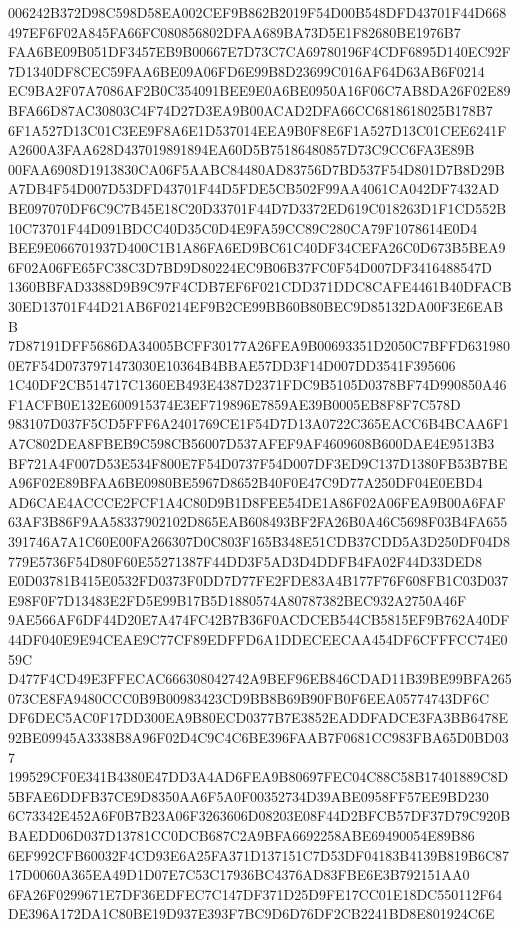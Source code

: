 \documentclass[UTF8,fontset=fandol,zihao=-4,a4paper]{ctexart}
\begin{document}
{{006242B372D98C598D58EA002CEF9B862B2019F54D00B548DFD43701F44D668497EF6F02A845FA66FC080856802DFAA689BA73D5E1F82680BE1976B7
FAA6BE09B051DF3457EB9B00667E7D73C7CA69780196F4CDF6895D140EC92F7D1340DF8CEC59FAA6BE09A06FD6E99B8D23699C016AF64D63AB6F0214
EC9BA2F07A7086AF2B0C354091BEE9E0A6BE0950A16F06C7AB8DA26F02E89BFA66D87AC30803C4F74D27D3EA9B00ACAD2DFA66CC6818618025B178B7
6F1A527D13C01C3EE9F8A6E1D537014EEA9B0F8E6F1A527D13C01CEE6241FA2600A3FAA628D437019891894EA60D5B75186480857D73C9CC6FA3E89B
00FAA6908D1913830CA06F5AABC84480AD83756D7BD537F54D801D7B8D29BA7DB4F54D007D53DFD43701F44D5FDE5CB502F99AA4061CA042DF7432AD
BE097070DF6C9C7B45E18C20D33701F44D7D3372ED619C018263D1F1CD552B10C73701F44D091BDCC40D35C0D4E9FA59CC89C280CA79F1078614E0D4
BEE9E066701937D400C1B1A86FA6ED9BC61C40DF34CEFA26C0D673B5BEA96F02A06FE65FC38C3D7BD9D80224EC9B06B37FC0F54D007DF3416488547D
1360BBFAD3388D9B9C97F4CDB7EF6F021CDD371DDC8CAFE4461B40DFACB30ED13701F44D21AB6F0214EF9B2CE99BB60B80BEC9D85132DA00F3E6EABB
7D87191DFF5686DA34005BCFF30177A26FEA9B00693351D2050C7BFFD6319800E7F54D0737971473030E10364B4BBAE57DD3F14D007DD3541F395606
1C40DF2CB514717C1360EB493E4387D2371FDC9B5105D0378BF74D990850A46F1ACFB0E132E600915374E3EF719896E7859AE39B0005EB8F8F7C578D
983107D037F5CD5FFF6A2401769CE1F54D7D13A0722C365EACC6B4BCAA6F1A7C802DEA8FBEB9C598CB56007D537AFEF9AF4609608B600DAE4E9513B3
BF721A4F007D53E534F800E7F54D0737F54D007DF3ED9C137D1380FB53B7BEA96F02E89BFAA6BE0980BE5967D8652B40F0E47C9D77A250DF04E0EBD4
AD6CAE4ACCCE2FCF1A4C80D9B1D8FEE54DE1A86F02A06FEA9B00A6FAF63AF3B86F9AA58337902102D865EAB608493BF2FA26B0A46C5698F03B4FA655
391746A7A1C60E00FA266307D0C803F165B348E51CDB37CDD5A3D250DF04D8779E5736F54D80F60E55271387F44DD3F5AD3D4DDFB4FA02F44D33DED8
E0D03781B415E0532FD0373F0DD7D77FE2FDE83A4B177F76F608FB1C03D037E98F0F7D13483E2FD5E99B17B5D1880574A80787382BEC932A2750A46F
9AE566AF6DF44D20E7A474FC42B7B36F0ACDCEB544CB5815EF9B762A40DF44DF040E9E94CEAE9C77CF89EDFFD6A1DDECEECAA454DF6CFFFCC74E059C
D477F4CD49E3FFECAC666308042742A9BEF96EB846CDAD11B39BE99BFA265073CE8FA9480CCC0B9B00983423CD9BB8B69B90FB0F6EEA05774743DF6C
DF6DEC5AC0F17DD300EA9B80ECD0377B7E3852EADDFADCE3FA3BB6478E92BE09945A3338B8A96F02D4C9C4C6BE396FAAB7F0681CC983FBA65D0BD037
199529CF0E341B4380E47DD3A4AD6FEA9B80697FEC04C88C58B17401889C8D5BFAE6DDFB37CE9D8350AA6F5A0F00352734D39ABE0958FF57EE9BD230
6C73342E452A6F0B7B23A06F3263606D08203E08F44D2BFCB57DF37D79C920BBAEDD06D037D13781CC0DCB687C2A9BFA6692258ABE69490054E89B86
6EF992CFB60032F4CD93E6A25FA371D137151C7D53DF04183B4139B819B6C8717D0060A365EA49D1D07E7C53C17936BC4376AD83FBE6E3B792151AA0
6FA26F0299671E7DF36EDFEC7C147DF371D25D9FE17CC01E18DC550112F64DE396A172DA1C80BE19D937E393F7BC9D6D76DF2CB2241BD8E801924C6E
}}
\end{document}
